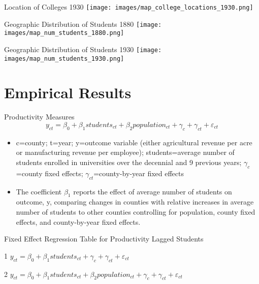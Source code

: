 \documentclass{beamer}
\begin{document}
\begin{frame}{Location of Colleges 1930}
\texttt{[image: images/map\_college\_locations\_1930.png]}
\end{frame}

\begin{frame}{Geographic Distribution of Students 1880}
\texttt{[image: images/map\_num\_students\_1880.png]}
\end{frame}

\begin{frame}{Geographic Distribution of Students 1930}
\texttt{[image: images/map\_num\_students\_1930.png]}
\end{frame}

\section{Empirical Results}
\begin{frame}{Productivity Measures}
\begin{equation*}
y_{ct}=\beta_0+\beta_1students_{ct}+\beta_2population_{ct}+\gamma_c+\gamma_{ct}+\varepsilon_{ct}
\end{equation*}
\begin{itemize}
\item c=county; t=year; y=outcome variable (either agricultural revenue per acre or manufacturing revenue per employee); students=average number of students enrolled in universities over the decennial and 9 previous years; $\gamma_c$=county fixed effects; $\gamma_{ct}$=county-by-year fixed effects
\item The coefficient $\beta_1$ reports the effect of average number of students on outcome, y, comparing changes in counties with relative increases in average number of students to other counties controlling for population, county fixed effects, and county-by-year fixed effects.
\end{itemize}
\end{frame}

\begin{frame}{Fixed Effect Regression Table for Productivity Lagged Students}
\begin{center}
\small
\begin{threeparttable}
\centering
 
\begin{tablenotes}
\footnotesize
\item[1]$y_{ct}=\beta_0+\beta_1students_{ct}+\gamma_c+\gamma_{ct}+\varepsilon_{ct}$
\item[2] $y_{ct}=\beta_0+\beta_1students_{ct}+\beta_2population_{ct}+\gamma_c+\gamma_{ct}+\varepsilon_{ct}$
\end{tablenotes}
\end{threeparttable}
\end{center}
\end{frame}
\end{document}
